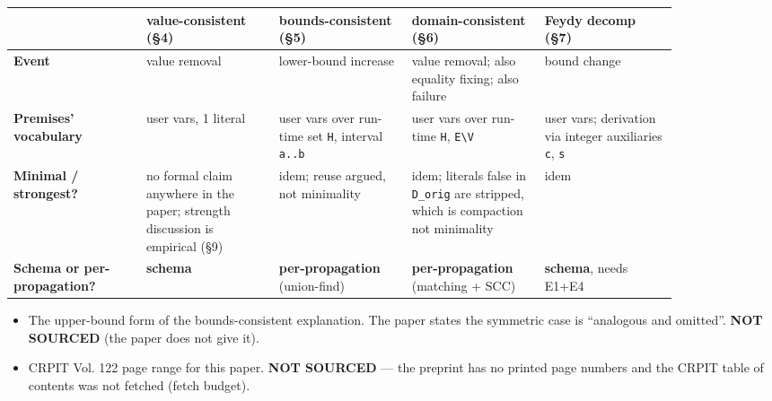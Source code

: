 \documentclass[10pt,a4paper]{article}
\newcommand{\provtag}[2]{{\small\sffamily\bfseries\textcolor{#1}{#2}}}
\newenvironment{pubblock}{%
  \par\smallskip
  \def\FrameCommand{\textcolor{litbar}{\vrule width 2.5pt}\hspace{9pt}}%
  \MakeFramed{\advance\hsize-\width\FrameRestore}}%
  {\endMakeFramed\par\smallskip}
\newcommand{\litsub}[1]{\par\smallskip{\sffamily\bfseries\textcolor{litbar}{#1}\par}}
\begin{document}
\begin{pubblock}
\par\smallskip
\litsub{Answers to the four catalog questions, condensed}
{\small\setlength{\tabcolsep}{3pt}
\begin{tabular}{@{}>{\raggedright\arraybackslash}p{0.172\linewidth}>{\raggedright\arraybackslash}p{0.172\linewidth}>{\raggedright\arraybackslash}p{0.172\linewidth}>{\raggedright\arraybackslash}p{0.172\linewidth}>{\raggedright\arraybackslash}p{0.172\linewidth}@{}}
\hline
 & \textbf{value-consistent (\S{}4)} & \textbf{bounds-consistent (\S{}5)} & \textbf{domain-consistent (\S{}6)} & \textbf{Feydy decomp (\S{}7)} \\
\hline
\textbf{Event} & value removal & lower-bound increase & value removal; also equality fixing; also failure & bound change \\
\textbf{Premises' vocabulary} & user vars, 1 literal & user vars over run-time set \texttt{H}, interval \texttt{a..b} & user vars over run-time \texttt{H}, \texttt{E\textbackslash{}V} & user vars; derivation via integer auxiliaries \texttt{c}, \texttt{s} \\
\textbf{Minimal / strongest?} & no formal claim anywhere in the paper; strength discussion is empirical (\S{}9) & idem; reuse argued, not minimality & idem; literals false in \texttt{D\_orig} are stripped, which is compaction not minimality & idem \\
\textbf{Schema or per-propagation?} & \textbf{schema} & \textbf{per-propagation} (union-find) & \textbf{per-propagation} (matching + SCC) & \textbf{schema}, needs E1+E4 \\
\hline
\end{tabular}\par}
\par\smallskip
\litsub{What was not sourced \ \provtag{tagnotsourced}{NOT SOURCED}}
\begin{itemize}\setlength{\itemsep}{0pt}
\item The upper-bound form of the bounds-consistent explanation. The paper states the symmetric case is ``analogous and omitted''. \provtag{tagnotsourced}{NOT SOURCED} (the paper does not give it).
\item CRPIT Vol. 122 page range for this paper. \provtag{tagnotsourced}{NOT SOURCED} --- the preprint has no printed page numbers and the CRPIT table of contents was not fetched (fetch budget).
\end{itemize}
\par\smallskip
\litsub{How the source file was produced}
{\small
\begin{itemize}\setlength{\itemsep}{0pt}

\end{itemize}}
\end{pubblock}
\end{document}
